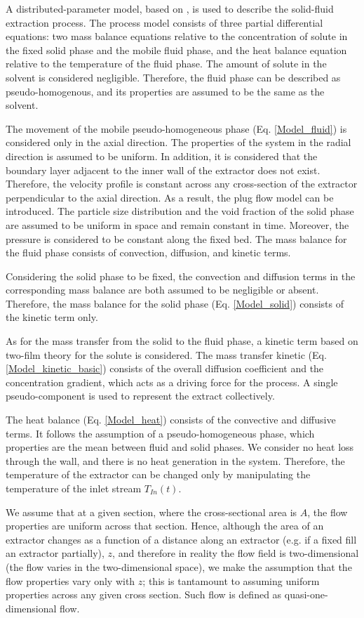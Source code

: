 \documentclass[../Article_Model_Parameters.tex]{subfiles}
\begin{document}
			
	{\color{blue}A distributed-parameter model, based on \citet{Reverchon1996}, is used to describe the solid-fluid extraction process. The process model consists of three partial differential equations: two mass balance equations relative to the concentration of solute in the fixed solid phase and the mobile fluid phase, and the heat balance equation relative to the temperature of the fluid phase. The amount of solute in the solvent is considered negligible. Therefore, the fluid phase can be described as pseudo-homogenous, and its properties are assumed to be the same as the solvent.
		
		The movement of the mobile pseudo-homogeneous phase (Eq. \ref{Model_fluid}) is considered only in the axial direction. The properties of the system in the radial direction is assumed to be uniform. In addition, it is considered that the boundary layer adjacent to the inner wall of the extractor does not exist. Therefore, the velocity profile is constant across any cross-section of the extractor perpendicular to the axial direction. As a result, the plug flow model can be introduced. The particle size distribution and the void fraction of the solid phase are assumed to be uniform in space and remain constant in time. Moreover, the pressure is considered to be constant along the fixed bed. The mass balance for the fluid phase consists of convection, diffusion, and kinetic terms.
		
		Considering the solid phase to be fixed, the convection and diffusion terms in the corresponding mass balance are both assumed to be negligible or absent. Therefore, the mass balance for the solid phase (Eq. \ref{Model_solid}) consists of the kinetic term only. 
		
		As for the mass transfer from the solid to the fluid phase, a kinetic term based on two-film theory for the solute is considered. The mass transfer kinetic (Eq. \ref{Model_kinetic_basic}) consists of the overall diffusion coefficient and the concentration gradient, which acts as a driving force for the process. A single pseudo-component is used to represent the extract collectively.
		
		The heat balance (Eq. \ref{Model_heat}) consists of the convective and diffusive terms. It follows the assumption of a pseudo-homogeneous phase, which properties are the mean between fluid and solid phases. We consider no heat loss through the wall, and there is no heat generation in the system. Therefore, the temperature of the extractor can be changed only by manipulating the temperature of the inlet stream $T_{In}(t)$.
		
		We assume that at a given section, where the cross-sectional area is $A$, the flow properties are uniform across that section. Hence, although the area of an extractor changes  as a function of a distance along an extractor (e.g. if a fixed fill an extractor partially), $z$, and therefore in reality the flow field is two-dimensional (the flow varies in the two-dimensional space), we make the assumption that the flow properties vary only with $z$; this is tantamount to assuming uniform properties across any given cross section. Such flow is defined as quasi-one-dimensional flow.
		
	}
	
\end{document}
